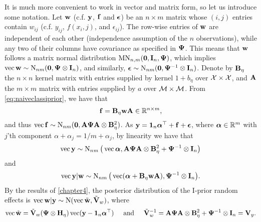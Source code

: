 It is much more  convenient to work in vector and matrix form, so let us introduce some notation.
Let ${\mathbf w}$ (c.f. ${\mathbf y}$, ${\mathbf f}$ and ${\bm\epsilon}$) be an $n \times m$ matrix whose $(i,j)$  entries contain $w_{ij}$ (c.f. $y_{ij}$, $f(x_i,j)$, and $\epsilon_{ij}$).
The row-wise entries of ${\mathbf w}$ are independent of each other (independence assumption of the $n$ observations), while any two of their columns have covariance as specified in ${\bm\Psi}$.
This means that ${\mathbf w}$ follows a matrix normal distribution $\operatorname{MN}_{n,m}({\mathbf 0}, {\mathbf I}_n,{\bm\Psi})$, which implies $\operatorname{vec} {\mathbf w} \sim \operatorname{N}_{nm}({\mathbf 0}, {\bm\Psi} \otimes {\mathbf I}_n)$, and similarly, ${\bm\epsilon} \sim \operatorname{N}_{nm}({\mathbf 0}, {\bm\Psi}^{-1} \otimes {\mathbf I}_n)$.
Denote by ${\mathbf B}_\eta$ the $n\times n$ kernel matrix with entries supplied by kernel $1 + b_\eta$ over ${\mathcal X} \times {\mathcal X}$, and ${\mathbf A}$ the $m\times m$ matrix with entries supplied by $a$ over ${\mathcal M} \times {\mathcal M}$.
From \cref{eq:naiveclassiprior}, we have that 
\[
  {\mathbf f} = {\mathbf B}_\eta {\mathbf w} {\mathbf A} \in \mathbb{R}^{n \times m},
\]
and thus $\operatorname{vec} {\mathbf f} \sim \operatorname{N}_{nm}({\mathbf 0}, {\mathbf A}{\bm\Psi}{\mathbf A} \otimes {\mathbf B}_\eta^2)$.
As ${\mathbf y} = {\mathbf 1}_n{\bm\alpha}^\top + {\mathbf f} + {\bm\epsilon}$, where ${\bm\alpha} \in \mathbb{R}^{m}$ with $j$'th component $\alpha + \alpha_j = 1/m + \alpha_j$, by linearity we have that 
\begin{equation}
  \operatorname{vec} {\mathbf y} \sim \operatorname{N}_{nm}\big(\operatorname{vec} {\bm\alpha}, {\mathbf A}{\bm\Psi}{\mathbf A} \otimes {\mathbf B}_\eta^2 + {\bm\Psi}^{-1} \otimes {\mathbf I}_n \big)
\end{equation}
and
\begin{equation}
  \operatorname{vec} {\mathbf y}| {\mathbf w} \sim \operatorname{N}_{nm}\big(\operatorname{vec} ({\bm\alpha}  + {\mathbf B}_\eta {\mathbf w} {\mathbf A}), {\bm\Psi}^{-1} \otimes {\mathbf I}_n \big).
\end{equation}
By the results of \cref{chapter4}, the posterior distribution of the I-prior random effects is $\operatorname{vec} {\mathbf w}|{\mathbf y} \sim \operatorname{N}(\operatorname{vec} \tilde{\mathbf w}, \tilde{{\mathbf V}}_w)$, where
\begin{gather}\label{eq:naiveclasspostw}
   \operatorname{vec} \tilde{{\mathbf w}} = \tilde{{\mathbf V}}_w 
    ({\bm\Psi} \otimes {\mathbf H}_\eta) \operatorname{vec} ({\mathbf y} - {\mathbf 1}_n{\bm\alpha}^\top)
  \hspace{0.5cm}\text{and}\hspace{0.5cm} 
  \tilde {{\mathbf V}}_w^{-1} = {\mathbf A}{\bm\Psi}{\mathbf A} \otimes {\mathbf B}_\eta^2 + {\bm\Psi}^{-1} \otimes {\mathbf I}_n = {\mathbf V}_{y}.
\end{gather}

